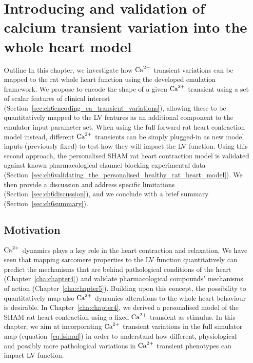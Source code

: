 \chapter{Introducing and validation of calcium transient variation into the whole heart model}\label{cha:chapter6}
%
%
%
\begin{remark}{Outline}
    In this chapter, we investigate how $\textrm{Ca}^{2+}$ transient variations can be mapped to the rat whole heart function using the developed emulation framework. We propose to encode the shape of a given $\textrm{Ca}^{2+}$ transient using a set of scalar features of clinical interest (Section~\ref{sec:ch6encoding_ca_transient_variations}), allowing these to be quantitatively mapped to the LV features as an additional component to the emulator input parameter set. When using the full forward rat heart contraction model instead, different $\textrm{Ca}^{2+}$ transients can be simply plugged-in as new model inputs (previously fixed) to test how they will impact the LV function. Using this second approach, the personalised SHAM rat heart contraction model is validated against known pharmacological channel blocking experimental data (Section~\ref{sec:ch6validating_the_personalised_healthy_rat_heart_model}). We then provide a discussion and address specific limitations (Section~\ref{sec:ch6discussion}), and we conclude with a brief summary (Section~\ref{sec:ch6summary}).
\end{remark}


%
%
%
\section{Motivation}\label{sec:ch6motivation}
$\textrm{Ca}^{2+}$ dynamics plays a key role in the heart contraction and relaxation. We have seen that mapping sarcomere properties to the LV function quantitatively can predict the mechanisms that are behind pathological conditions of the heart (Chapter~\ref{cha:chapter4}) and validate pharmacological compounds' mechanisms of action (Chapter~\ref{cha:chapter5}). Building upon this concept, the possibility to quantitatively map also $\textrm{Ca}^{2+}$ dynamics alterations to the whole heart behaviour is desirable. In Chapter~\ref{cha:chapter4}, we derived a personalised model of the SHAM rat heart contraction using a fixed $\textrm{Ca}^{2+}$ transient as stimulus. In this chapter, we aim at incorporating $\textrm{Ca}^{2+}$ transient variations in the full simulator map (equation~\ref{eq:fsimul}) in order to understand how different, physiological and possibly more pathological variations in $\textrm{Ca}^{2+}$ transient phenotypes can impact LV function.


